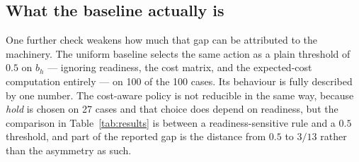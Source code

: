 \documentclass{article}
\begin{document}
\subsection{What the baseline actually is}
One further check weakens how much that gap can be attributed to the machinery.
The uniform baseline selects the same action as a plain threshold of $0.5$ on
$b_h$ --- ignoring readiness, the cost matrix, and the expected-cost computation
entirely --- on 100 of the 100 cases. Its behaviour is fully described by one
number. The cost-aware policy is not reducible in the same way, because
\emph{hold} is chosen on 27 cases and that choice does depend on readiness, but the
comparison in Table~\ref{tab:results} is between a readiness-sensitive rule and a
$0.5$ threshold, and part of the reported gap is the distance from $0.5$ to
$3/13$ rather than the asymmetry as such.
\end{document}
